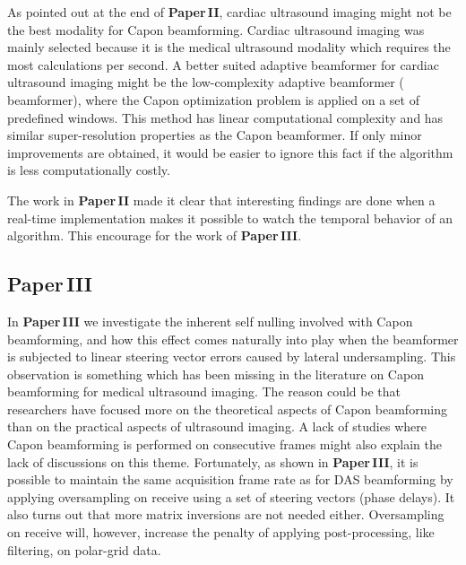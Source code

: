 As pointed out at the end of \textbf{Paper\,II}, cardiac ultrasound imaging might not be the best modality for Capon beamforming. Cardiac ultrasound imaging was mainly selected because it is the medical ultrasound modality which requires the most calculations per second. A better suited adaptive beamformer for cardiac ultrasound imaging might be the low-complexity adaptive beamformer ( beamformer), where the Capon optimization problem is applied on a set of predefined windows. This method has linear computational complexity and has similar super-resolution properties as the Capon beamformer. If only minor improvements are obtained, it would be easier to ignore this fact if the algorithm is less computationally costly. %

The work in \textbf{Paper\,II} made it clear that interesting findings are done when a real-time implementation makes it possible to watch the temporal behavior of an algorithm. This encourage for the work of \textbf{Paper\,III}. 

\subsection{Paper\,III}
In \textbf{Paper\,III} we investigate the inherent self nulling involved with Capon beamforming, and how this effect comes naturally into play when the beamformer is subjected to linear steering vector errors caused by lateral undersampling. This observation is something which has been missing in the literature on Capon beamforming for medical ultrasound imaging. The reason could be that researchers have focused more on the theoretical aspects of Capon beamforming than on the practical aspects of ultrasound imaging. A lack of studies where Capon beamforming is performed on consecutive frames might also explain the lack of discussions on this theme. Fortunately, as shown in \textbf{Paper\,III}, it is possible to maintain the same acquisition frame rate as for DAS beamforming by applying oversampling on receive using a set of steering vectors (phase delays). It also turns out that more matrix inversions are not needed either. Oversampling on receive will, however,  increase the penalty of applying post-processing, like filtering,  on polar-grid data. %


